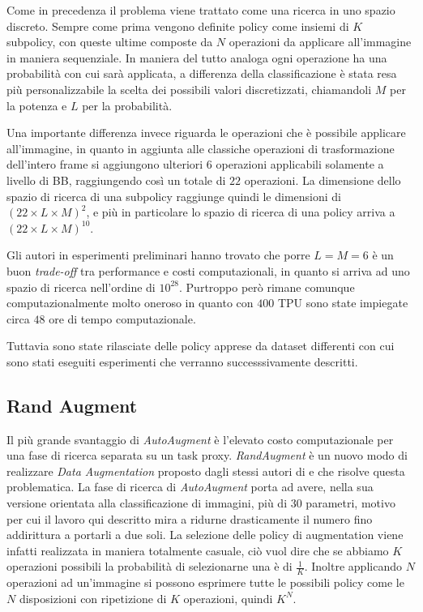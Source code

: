 Come in precedenza il problema viene trattato come una ricerca in uno spazio discreto. Sempre come prima vengono definite policy come insiemi di $K$ subpolicy, con queste ultime composte da $N$ operazioni da applicare all'immagine in maniera sequenziale. In maniera del tutto analoga ogni operazione ha una probabilità con cui sarà applicata, a differenza della classificazione è stata resa più personalizzabile la scelta dei possibili valori discretizzati, chiamandoli $M$ per la potenza e $L$ per la probabilità. 

Una importante differenza invece riguarda le operazioni che è possibile applicare all'immagine, in quanto in aggiunta alle classiche operazioni di trasformazione dell'intero frame si aggiungono ulteriori $6$ operazioni applicabili solamente a livello di \ac{BB}, raggiungendo così un totale di $22$ operazioni. La dimensione dello spazio di ricerca di una subpolicy raggiunge quindi le dimensioni di $(22 \times L \times M)^2$, e più in particolare lo spazio di ricerca di una policy arriva a $(22 \times L \times M)^{10}$.


Gli autori in esperimenti preliminari hanno trovato che porre $L = M = 6$ è un buon \textit{trade-off} tra performance e costi computazionali, in quanto si arriva ad uno spazio di ricerca nell'ordine di $10^{28}$. Purtroppo però rimane comunque computazionalmente molto oneroso in quanto con $400$ \ac{TPU} sono state impiegate circa $48$ ore di tempo computazionale. 

Tuttavia sono state rilasciate delle policy apprese da dataset differenti con cui sono stati eseguiti esperimenti che verranno successsivamente descritti. 

\subsection{Rand Augment}
\label{subsec:rand_augment}
Il più grande svantaggio di \textit{AutoAugment} è l'elevato costo computazionale per una fase di ricerca separata su un task proxy. \textit{RandAugment} \cite{DBLP:journals/corr/abs-1909-13719} è un nuovo modo di realizzare \textit{Data Augmentation} proposto dagli stessi autori di \cite{DBLP:journals/corr/abs-1805-09501} e \cite{DBLP:journals/corr/abs-1906-11172} che risolve questa problematica. La fase di ricerca di \textit{AutoAugment} porta ad avere, nella sua versione orientata alla classificazione di immagini, più di 30 parametri, motivo per cui il lavoro qui descritto mira a ridurne drasticamente il numero fino addirittura a portarli a due soli. La selezione delle policy di augmentation viene infatti realizzata in maniera totalmente casuale, ciò vuol dire che se abbiamo $K$ operazioni possibili la probabilità di selezionarne una è di $\frac{1}{K}$. Inoltre applicando $N$ operazioni ad un'immagine si possono esprimere tutte le possibili policy come le $N$ disposizioni con ripetizione di $K$ operazioni, quindi $K^N$.

